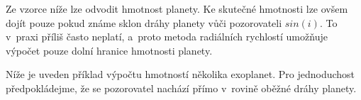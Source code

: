 \documentclass[a4paper,12pt]{article}
\begin{document}
Ze vzorce níže lze odvodit hmotnost planety. Ke skutečné hmotnosti lze ovšem dojít pouze pokud známe sklon dráhy planety vůči pozorovateli $sin(i)$. To v~praxi příliš často neplatí, a~proto metoda radiálních rychlostí umožňuje výpočet pouze dolní hranice hmotnosti planety.


Níže je uveden příklad výpočtu hmotností několika exoplanet. Pro jednoduchost předpokládejme, že se pozorovatel nachází přímo v~rovině oběžné dráhy planety.
\end{document}
